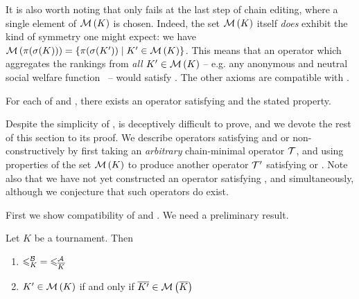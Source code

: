 It is also worth noting that \anon{} only fails at the last step of chain
editing, where a single element of $\operatorname{\mathcal{M}}\left({K}\right)$ is chosen. Indeed, the set
$\operatorname{\mathcal{M}}\left({K}\right)$ itself \emph{does} exhibit the kind of symmetry one might expect:
we have $\operatorname{\mathcal{M}}\left({\pi(\sigma(K))}\right) = \{\pi(\sigma(K')) \mid K' \in \operatorname{\mathcal{M}}\left({K}\right)\}$.
This means that an operator which aggregates the rankings from \emph{all} $K'
\in \operatorname{\mathcal{M}}\left({K}\right)$ -- e.g. any anonymous and neutral social welfare
function~\cite{zwicker2016voting} -- would satisfy \anon{}. The other axioms
are compatible with \chainmin{}.

\begin{theorem}
    \label{tourn_result_chainmin_axiom_compatibilities}

    For each of \dualaxiom{} and \mon{}, there exists an operator
    satisfying \chainmin{} and the stated property.

\end{theorem}

Despite the simplicity of \mon{},
 is deceptively difficult to
prove, and we devote the rest of this section to its proof. We describe
operators satisfying \chaindef{} and \dualaxiom{} or \mon{}
non-constructively by first taking an \emph{arbitrary} chain-minimal operator
$\mathcal{T}$, and using properties of the set $\operatorname{\mathcal{M}}\left({K}\right)$ to produce another operator
$\mathcal{T}'$ satisfying \dualaxiom{} or \mon{}. Note also that we have
not yet constructed an operator satisfying \dualaxiom{}, \mon{} and
\chainmin{} simultaneously, although we conjecture that such operators
do exist.

First we show compatibility of \chainmin{} and \dualaxiom{}. We
need a preliminary result.

\begin{lemma}
    \label{tourn_result_chainmin_dual_lemma}
    Let $K$ be a tournament. Then
    \begin{enumerate}
        \item ${\leqslant^{\mathcal{B}}_K} = {\leqslant^{\mathcal{A}}_{{\overline{K}}}}$ \label{tourn_item_dual_lemma_nle}
        \item $K' \in \operatorname{\mathcal{M}}\left({K}\right)$ if and only if ${\overline{K'}} \in
              \operatorname{\mathcal{M}}\left({{\overline{K}}}\right)$
              \label{tourn_item_dual_lemma_minch}
    \end{enumerate}
\end{lemma}

